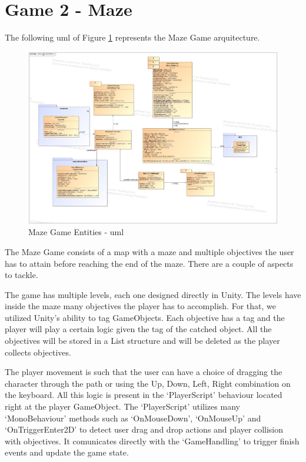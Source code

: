 \section{Game 2 - Maze}
\label{arqMaze}

The following \gls{uml} of Figure \ref{fig:mazeGameArq} represents the Maze Game arquitecture.

\begin{figure}[H]
    \centering
    \includegraphics[width=\linewidth]{Chapters/new_architechture/class__maze__MazeGame.jpg}
    \caption{Maze Game Entities - \gls{uml}}
    \label{fig:mazeGameArq}
\end{figure}

The Maze Game consists of a map with a maze and multiple objectives the user has to attain before reaching the end of the maze. There are a couple of aspects to tackle.

The game has multiple levels, each one designed directly in Unity. The levels have inside the maze many objectives the player has to accomplish. For that, we utilized Unity's ability to tag GameObjects. Each objective has a tag and the player will play a certain logic given the tag of the catched object. All the objectives will be stored in a List structure and will be deleted as the player collects objectives.

The player movement is such that the user can have a choice of dragging the character through the path or using the Up, Down, Left, Right combination on the keyboard. All this logic is present in the `PlayerScript' behaviour located right at the player GameObject. The `PlayerScript' utilizes many `MonoBehaviour' methods such as `OnMouseDown', `OnMouseUp' and `OnTriggerEnter2D' to detect user drag and drop actions and player collision with objectives. It comunicates directly with the `GameHandling' to trigger finish events and update the game state.

